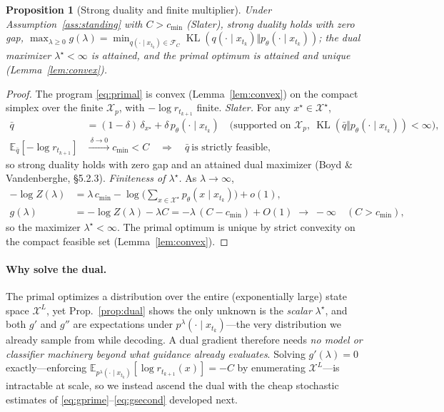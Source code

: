 \documentclass{article}
\newtheorem{proposition}{Proposition}
\DeclareMathOperator{\KL}{KL}
\newcommand{\E}{\mathbb{E}}
\newcommand{\X}{\mathcal{X}}
\newcommand{\lstar}{\lambda^{\star}}
\newcommand{\qlam}{p^{\lambda}(\cdot\mid x_{t_k})}
\begin{document}
\begin{proposition}[Strong duality and finite multiplier]
\label{prop:strongduality}
Under Assumption~\ref{ass:standing} with $C>c_{\min}$ (Slater), strong duality holds with zero gap, $\max_{\lambda\ge0}g(\lambda)=\min_{q(\cdot\mid x_{t_k})\in\mathcal F_C}\KL(q(\cdot\mid x_{t_k})\Vert p_\theta(\cdot\mid x_{t_k}))$; the dual maximizer $\lstar<\infty$ is attained, and the primal optimum is attained and unique (Lemma~\ref{lem:convex}).
\end{proposition}
\begin{proof}
The program \eqref{eq:primal} is convex (Lemma~\ref{lem:convex}) on the compact simplex over the finite $\X_p$, with $-\log r_{t_{k+1}}$ finite. \emph{Slater.} For any $x^\star\in\X^\star$,
\begin{align*}
\bar q&=(1-\delta)\,\delta_{x^\star}+\delta\,p_\theta(\cdot\mid x_{t_k})
  \quad\big(\text{supported on }\X_p,\ \KL(\bar q\Vert p_\theta(\cdot\mid x_{t_k}))<\infty\big),\\
\E_{\bar q}[-\log r_{t_{k+1}}]&\xrightarrow{\ \delta\to0\ }c_{\min}<C
  \quad\Longrightarrow\quad \bar q\ \text{is strictly feasible},
\end{align*}
so strong duality holds with zero gap and an attained dual maximizer (Boyd \& Vandenberghe, \S5.2.3). \emph{Finiteness of $\lstar$.} As $\lambda\to\infty$,
\begin{align*}
-\log Z(\lambda)&=\lambda\,c_{\min}-\log\!\Big(\sum_{x\in\X^\star}p_\theta(x\mid x_{t_k})\Big)+o(1),\\
g(\lambda)&=-\log Z(\lambda)-\lambda C=-\lambda\,(C-c_{\min})+O(1)\;\longrightarrow\;-\infty\quad(C>c_{\min}),
\end{align*}
so the maximizer $\lstar<\infty$. The primal optimum is unique by strict convexity on the compact feasible set (Lemma~\ref{lem:convex}).
\end{proof}

\paragraph{Why solve the dual.} The primal optimizes a distribution over the entire (exponentially large) state space $\X^L$, yet Prop.~\ref{prop:dual} shows the only unknown is the \emph{scalar} $\lstar$, and both $g'$ and $g''$ are expectations under $\qlam$---the very distribution we already sample from while decoding. A dual gradient therefore needs \emph{no model or classifier machinery beyond what guidance already evaluates}. Solving $g'(\lambda)=0$ exactly---enforcing $\E_{p^{\lambda}(\cdot\mid x_{t_k})}[\log r_{t_{k+1}}(x)]=-C$ by enumerating $\X^L$---is intractable at scale, so we instead ascend the dual with the cheap stochastic estimates of \eqref{eq:gprime}--\eqref{eq:gsecond} developed next.
\end{document}
